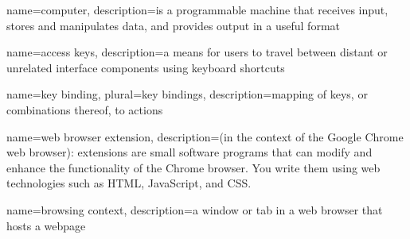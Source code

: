 {
  name=computer,
  description={is a programmable machine that receives input,
               stores and manipulates data, and provides
               output in a useful format}
}




{
  name=access keys,
  description={a means for users to travel between distant or unrelated interface components using keyboard shortcuts}
}

{
  name=key binding,
  plural=key bindings,
  description={mapping of keys, or combinations thereof, to actions}
}

{
  name=web browser extension,
  description={(in the context of the Google Chrome web browser): extensions are small software programs that can modify and enhance the functionality of the Chrome browser. You write them using web technologies such as HTML, JavaScript, and CSS.}
}

{
  name=browsing context,
  description={a window or tab in a web browser that hosts a webpage}
}